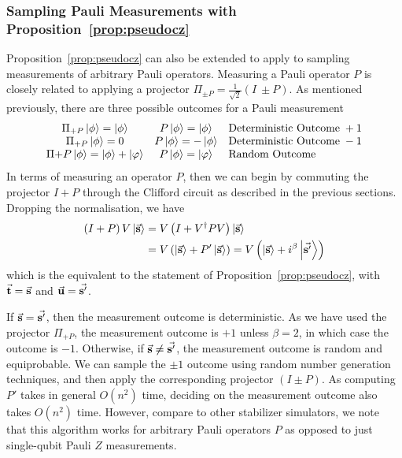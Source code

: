 \subsubsection{Sampling Pauli Measurements with Proposition~\ref{prop:pseudocz}}
Proposition~\ref{prop:pseudocz} can also be extended to apply to sampling measurements of arbitrary Pauli operators. Measuring a Pauli operator $P$ is closely related to applying a projector $\Pi_{\pm P}=\frac{1}{\sqrt{2}}\left(I\ \pm P\right)$. As mentioned previously, there are three possible outcomes for a Pauli measurement
\[
\begin{array}{c c l}
\Pi_{+P}\ket{\phi} = \ket{\phi} & P\ket{\phi} = \ket{\phi} & \text{Deterministic Outcome}\;+1\\
\Pi_{+P}\ket{\phi} = 0 & P\ket{\phi} = -\ket{\phi} & \text{Deterministic Outcome}\; -1\\
\Pi{+P}\ket{\phi} = \ket{\phi}+\ket{\varphi} & P\ket{\phi}=\ket{\varphi} & \text{Random Outcome} \\
\end{array}
\]
In terms of measuring an operator $P$, then we can begin by commuting the projector $I+P$ through the Clifford circuit as described in the previous sections. Dropping the normalisation, we have
\begin{align*}
\left(I+P\right)V\ket{\va{s}} &= V\left(I+V^{\dagger}PV\right)\ket{\va{s}} \\
& = V\left(\ket{\va{s}}+P'\ket{\va{s}}\right) = V\left(\ket{\va{s}}+i^{\beta}\ket{\va{s'}}\right)
\end{align*}
which is the equivalent to the statement of Proposition~\ref{prop:pseudocz}, with $\va{t}=\va{s}$ and $\va{u}=\va{s'}$.\par
If $\va{s}=\va{s'}$, then the measurement outcome is deterministic. As we have used the projector $\Pi_{+P}$, the measurement outcome is $+1$ unless $\beta=2$, in which case the outcome is $-1$. Otherwise, if $\va{s}\neq \va{s'}$, the measurement outcome is random and equiprobable. We can sample the $\pm 1$ outcome using random number generation techniques, and then apply the corresponding projector $\left(I\pm P\right)$. As computing $P'$ takes in general $O(n^{2})$ time, deciding on the measurement outcome also takes $O(n^{2})$ time. However, compare to other stabilizer simulators, we note that this algorithm works for arbitrary Pauli operators $P$ as opposed to just single-qubit Pauli $Z$ measurements.
